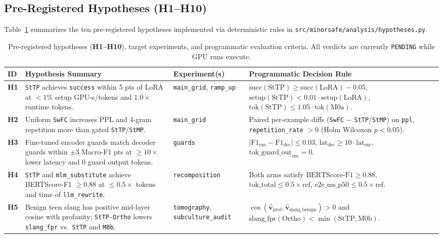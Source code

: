 \documentclass[11pt,letterpaper]{article}
\begin{document}
\subsection{Pre-Registered Hypotheses (\textbf{H1--H10})}
Table~\ref{tab:hypotheses_design} summarizes the ten pre-registered hypotheses implemented via deterministic rules in \texttt{src/minorsafe/analysis/hypotheses.py}.

\begin{table}[ht]
\centering
\caption{Pre-registered hypotheses (\textbf{H1--H10}), target experiments, and programmatic evaluation criteria. All verdicts are currently \texttt{PENDING} while GPU runs execute.}
\label{tab:hypotheses_design}
\small
\begin{tabular}{p{} p{} p{} p{}}
\toprule
\textbf{ID} & \textbf{Hypothesis Summary} & \textbf{Experiment(s)} & \textbf{Programmatic Decision Rule} \\
\midrule
\textbf{H1} & \texttt{StTP} achieves \texttt{success} within 5 pts of LoRA at $<1\%$ setup GPU-s/tokens and $1.0\times$ runtime tokens. & \texttt{main\_grid}, \texttt{ramp\_up} & $\text{succ}(\text{StTP}) \ge \text{succ}(\text{LoRA}) - 0.05$, $\text{setup}(\text{StTP}) < 0.01 \cdot \text{setup}(\text{LoRA})$, $\text{tok}(\text{StTP}) \le 1.05 \cdot \text{tok}(\text{M0a})$. \\
\textbf{H2} & Uniform \texttt{SwFC} increases PPL and 4-gram repetition more than gated \texttt{StTP}/\texttt{StMP}. & \texttt{main\_grid} & Paired per-example diffs (\texttt{SwFC} $-$ \texttt{StTP}/\texttt{StMP}) on \texttt{ppl}, \texttt{repetition\_rate} $> 0$ (Holm Wilcoxon $p < 0.05$). \\
\textbf{H3} & Fine-tuned encoder guards match decoder guards within $\pm 3$ Macro-F1 pts at $\ge 10\times$ lower latency and $0$ guard output tokens. & \texttt{guards} & $|\text{F1}_{\text{enc}} - \text{F1}_{\text{dec}}| \le 0.03$, $\text{lat}_{\text{dec}} \ge 10 \cdot \text{lat}_{\text{enc}}$, $\text{tok\_guard\_out}_{\text{enc}} = 0$. \\
\textbf{H4} & \texttt{StTP} and \texttt{mlm\_substitute} achieve BERTScore-F1 $\ge 0.88$ at $\le 0.5\times$ tokens and time of \texttt{llm\_rewrite}. & \texttt{recomposition} & Both arms satisfy $\text{BERTScore-F1} \ge 0.88$, $\text{tok\_total} \le 0.5\times\text{ref}$, $\text{e2e\_ms\_p50} \le 0.5\times\text{ref}$. \\
\textbf{H5} & Benign teen slang has positive mid-layer cosine with profanity; \texttt{StTP-Ortho} lowers \texttt{slang\_fpr} vs.\ \texttt{StTP} and \texttt{M0b}. & \texttt{tomography}, \texttt{subculture\_audit} & $\cos(\hat{\mathbf{v}}_{\text{prof}}, \hat{\mathbf{v}}_{\text{slang\_benign}}) > 0$ and $\text{slang\_fpr}(\text{Ortho}) < \min(\text{StTP}, \text{M0b})$. \\

\end{tabular}
\end{table}
\end{document}
